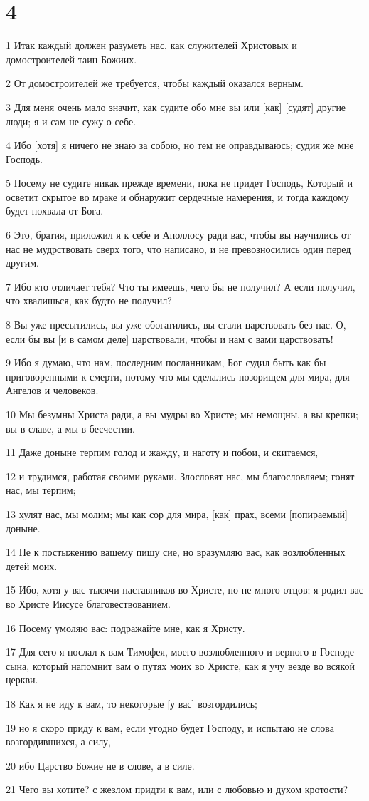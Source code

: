 \chapter{4}

\par 1 Итак каждый должен разуметь нас, как служителей Христовых и домостроителей таин Божиих.
\par 2 От домостроителей же требуется, чтобы каждый оказался верным.
\par 3 Для меня очень мало значит, как судите обо мне вы или [как] [судят] другие люди; я и сам не сужу о себе.
\par 4 Ибо [хотя] я ничего не знаю за собою, но тем не оправдываюсь; судия же мне Господь.
\par 5 Посему не судите никак прежде времени, пока не придет Господь, Который и осветит скрытое во мраке и обнаружит сердечные намерения, и тогда каждому будет похвала от Бога.
\par 6 Это, братия, приложил я к себе и Аполлосу ради вас, чтобы вы научились от нас не мудрствовать сверх того, что написано, и не превозносились один перед другим.
\par 7 Ибо кто отличает тебя? Что ты имеешь, чего бы не получил? А если получил, что хвалишься, как будто не получил?
\par 8 Вы уже пресытились, вы уже обогатились, вы стали царствовать без нас. О, если бы вы [и в самом деле] царствовали, чтобы и нам с вами царствовать!
\par 9 Ибо я думаю, что нам, последним посланникам, Бог судил быть как бы приговоренными к смерти, потому что мы сделались позорищем для мира, для Ангелов и человеков.
\par 10 Мы безумны Христа ради, а вы мудры во Христе; мы немощны, а вы крепки; вы в славе, а мы в бесчестии.
\par 11 Даже доныне терпим голод и жажду, и наготу и побои, и скитаемся,
\par 12 и трудимся, работая своими руками. Злословят нас, мы благословляем; гонят нас, мы терпим;
\par 13 хулят нас, мы молим; мы как сор для мира, [как] прах, всеми [попираемый] доныне.
\par 14 Не к постыжению вашему пишу сие, но вразумляю вас, как возлюбленных детей моих.
\par 15 Ибо, хотя у вас тысячи наставников во Христе, но не много отцов; я родил вас во Христе Иисусе благовествованием.
\par 16 Посему умоляю вас: подражайте мне, как я Христу.
\par 17 Для сего я послал к вам Тимофея, моего возлюбленного и верного в Господе сына, который напомнит вам о путях моих во Христе, как я учу везде во всякой церкви.
\par 18 Как я не иду к вам, то некоторые [у вас] возгордились;
\par 19 но я скоро приду к вам, если угодно будет Господу, и испытаю не слова возгордившихся, а силу,
\par 20 ибо Царство Божие не в слове, а в силе.
\par 21 Чего вы хотите? с жезлом придти к вам, или с любовью и духом кротости?

